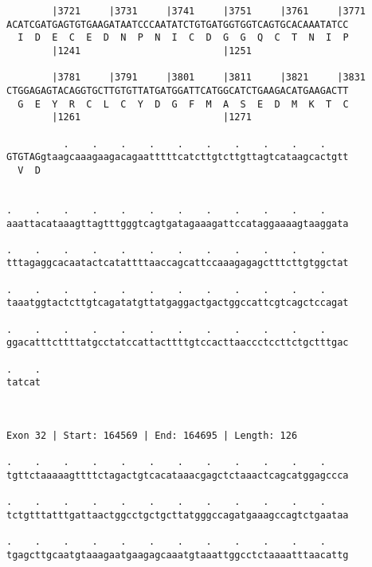 \documentclass{article}
\begin{document}
\begin{Verbatim}
        |3721     |3731     |3741     |3751     |3761     |3771
ACATCGATGAGTGTGAAGATAATCCCAATATCTGTGATGGTGGTCAGTGCACAAATATCC
  I  D  E  C  E  D  N  P  N  I  C  D  G  G  Q  C  T  N  I  P
        |1241                         |1251                 
  
        |3781     |3791     |3801     |3811     |3821     |3831
CTGGAGAGTACAGGTGCTTGTGTTATGATGGATTCATGGCATCTGAAGACATGAAGACTT
  G  E  Y  R  C  L  C  Y  D  G  F  M  A  S  E  D  M  K  T  C
        |1261                         |1271                 
  
          .    .    .    .    .    .    .    .    .    .    
GTGTAGgtaagcaaagaagacagaatttttcatcttgtcttgttagtcataagcactgtt
  V  D                                                      
                                                            
  
.    .    .    .    .    .    .    .    .    .    .    .    
aaattacataaagttagtttgggtcagtgatagaaagattccataggaaaagtaaggata
                                                            
.    .    .    .    .    .    .    .    .    .    .    .    
tttagaggcacaatactcatattttaaccagcattccaaagagagctttcttgtggctat
                                                            
.    .    .    .    .    .    .    .    .    .    .    .    
taaatggtactcttgtcagatatgttatgaggactgactggccattcgtcagctccagat
                                                            
.    .    .    .    .    .    .    .    .    .    .    .    
ggacatttcttttatgcctatccattacttttgtccacttaaccctccttctgctttgac
                                                            
.    .
tatcat
      
      
 
Exon 32 | Start: 164569 | End: 164695 | Length: 126
 
.    .    .    .    .    .    .    .    .    .    .    .    
tgttctaaaaagttttctagactgtcacataaacgagctctaaactcagcatggagccca
                                                            
.    .    .    .    .    .    .    .    .    .    .    .    
tctgtttatttgattaactggcctgctgcttatgggccagatgaaagccagtctgaataa
                                                            
.    .    .    .    .    .    .    .    .    .    .    .    
tgagcttgcaatgtaaagaatgaagagcaaatgtaaattggcctctaaaatttaacattg
                                                            

\end{Verbatim}
\end{document}
